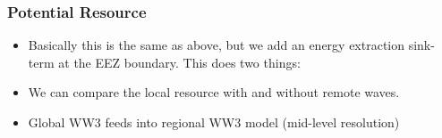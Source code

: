 \subsubsection{Potential Resource}

\begin{itemize}
\item Basically this is the same as above, but we add an energy extraction sink-term at the EEZ boundary. This does two things:
\item We can compare the local resource with and without remote waves.
\item Global WW3 feeds into regional WW3 model (mid-level resolution)
\end{itemize}

